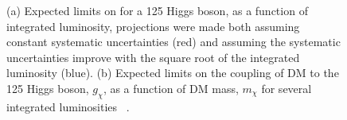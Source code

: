 \begin{figure}

  \caption{(a) Expected limits on \BRinv for a 125 \GeV Higgs boson, as a function of integrated luminosity, projections were made both assuming constant systematic uncertainties (red) and assuming the systematic uncertainties improve with the square root of the integrated luminosity (blue). (b) Expected limits on the coupling of \ac{DM} to the 125 \GeV Higgs boson, $g_{\chi}$, as a function of \ac{DM} mass, $m_{\chi}$ for several integrated luminosities ~\cite{ourdmpaper}.}
  \label{fig:smprojectedlimits}
\end{figure}

